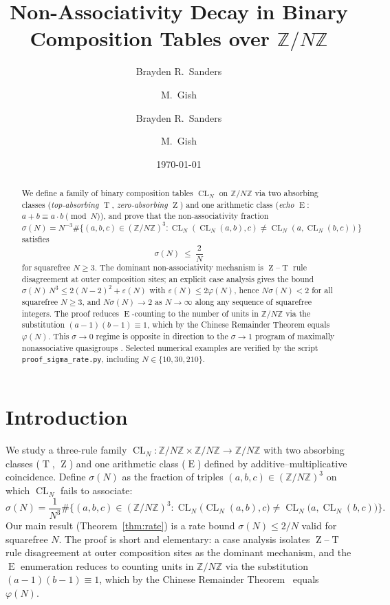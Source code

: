\documentclass[11pt,reqno]{amsart}
\title[Non-associativity decay on \texorpdfstring{$\mathbb{Z}/N\mathbb{Z}$}{Z/NZ}]%
{Non-Associativity Decay in Binary Composition Tables over
$\mathbb{Z}/N\mathbb{Z}$}
\author{Brayden R.\ Sanders \and M.\ Gish}
\author{Brayden R.\ Sanders \and M.\ Gish}
\date{\today}
\theoremstyle{plain}
\theoremstyle{definition}
\theoremstyle{remark}
\DeclareMathOperator{\CL}{CL}
\DeclareMathOperator{\ECHO}{E}
\DeclareMathOperator{\HARM}{T}
\DeclareMathOperator{\VOID}{Z}
\newcommand{\ZN}{\mathbb{Z}/N\mathbb{Z}}
\begin{document}
\begin{abstract}
We define a family of binary composition tables $\CL_N$ on $\ZN$ via
two absorbing classes (\emph{top-absorbing} $\HARM$, \emph{zero-absorbing}
$\VOID$) and one arithmetic class (\emph{echo} $\ECHO$: $a+b\equiv a\cdot b\pmod N$),
and prove that the non-associativity fraction
$\sigma(N)=N^{-3}\#\{(a,b,c)\in(\ZN)^{3}:\CL_N(\CL_N(a,b),c)\neq\CL_N(a,\CL_N(b,c))\}$
satisfies
\[
  \sigma(N)\;\le\;\frac{2}{N}
\]
for squarefree $N\ge 3$. The dominant non-associativity mechanism is
$\VOID$--$\HARM$ rule disagreement at outer composition sites; an
explicit case analysis gives the bound
$\sigma(N)\,N^{3}\le 2(N-2)^{2}+\varepsilon(N)$ with
$\varepsilon(N)\le 2\varphi(N)$, hence $N\sigma(N)<2$ for all
squarefree $N\ge 3$, and $N\sigma(N)\to 2$ as $N\to\infty$ along
any sequence of squarefree integers. The proof reduces $\ECHO$-counting to
the number of units in $\ZN$ via the substitution
$(a-1)(b-1)\equiv 1$, which by the Chinese Remainder Theorem equals
$\varphi(N)$. This $\sigma\to 0$ regime is opposite in direction to
the $\sigma\to 1$ program of maximally nonassociative quasigroups
\cite{DrapalWanless2021,DrapalLisonek2020}. Selected numerical examples
are verified by the script \texttt{proof\_sigma\_rate.py}, including
$N\in\{10,30,210\}$.
\end{abstract}

\maketitle

\section{Introduction}\label{sec:intro}

We study a three-rule family $\CL_N:\ZN\times\ZN\to\ZN$ with two
absorbing classes ($\HARM$, $\VOID$) and one arithmetic class
($\ECHO$) defined by additive--multiplicative coincidence. Define
$\sigma(N)$ as the fraction of triples $(a,b,c)\in(\ZN)^3$ on which
$\CL_N$ fails to associate:
\begin{equation}\label{eq:sigma-def}
  \sigma(N)=\frac{1}{N^{3}}
  \#\Big\{(a,b,c)\in(\ZN)^{3}:
         \CL_N\!\big(\CL_N(a,b),c\big)\neq\CL_N\!\big(a,\CL_N(b,c)\big)\Big\}.
\end{equation}
Our main result (Theorem~\ref{thm:rate}) is a rate bound
$\sigma(N)\le 2/N$ valid for squarefree $N$. The proof is short
and elementary: a case analysis isolates $\VOID$--$\HARM$ rule
disagreement at outer composition sites as the dominant mechanism,
and the $\ECHO$ enumeration reduces to counting units in $\ZN$
via the substitution $(a-1)(b-1)\equiv 1$, which by the Chinese
Remainder Theorem~\cite{Gauss1801,Lang2002} equals $\varphi(N)$.
\end{document}
